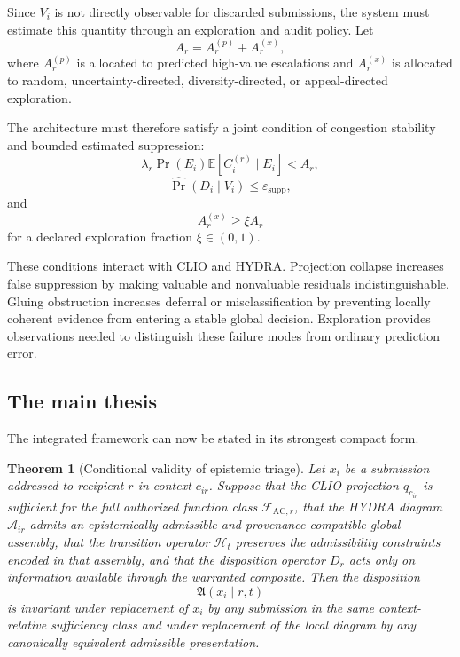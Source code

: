 \documentclass[11pt]{article}
\newtheorem{theorem}[definition]{Theorem}
\theoremstyle{definition}
\DeclareMathOperator{\Prob}{Pr}
\newcommand{\E}{\mathbb{E}}
\newcommand{\F}{\mathcal{F}}
\newcommand{\A}{\mathcal{A}}
\newcommand{\Hh}{\mathcal{H}}
\newcommand{\eps}{\varepsilon}
\newcommand{\AC}{\mathfrak{A}}
\begin{document}
Since \(V_i\) is not directly observable for discarded submissions, the system must estimate this quantity through an exploration and audit policy. Let
\[
A_r=A_r^{(p)}+A_r^{(x)},
\]
where \(A_r^{(p)}\) is allocated to predicted high-value escalations and \(A_r^{(x)}\) is allocated to random, uncertainty-directed, diversity-directed, or appeal-directed exploration.

The architecture must therefore satisfy a joint condition of congestion stability and bounded estimated suppression:
\[
\lambda_r
\Prob(E_i)
\E[C_i^{(r)}\mid E_i]
<
A_r,
\]
\[
\widehat{\Prob}(D_i\mid V_i)
\leq
\eps_{\mathrm{supp}},
\]
and
\[
A_r^{(x)}
\geq
\xi A_r
\]
for a declared exploration fraction \(\xi\in(0,1)\).

These conditions interact with CLIO and HYDRA. Projection collapse increases false suppression by making valuable and nonvaluable residuals indistinguishable. Gluing obstruction increases deferral or misclassification by preventing locally coherent evidence from entering a stable global decision. Exploration provides observations needed to distinguish these failure modes from ordinary prediction error.

\subsection{The main thesis}

The integrated framework can now be stated in its strongest compact form.

\begin{theorem}[Conditional validity of epistemic triage]
Let \(x_i\) be a submission addressed to recipient \(r\) in context \(c_{ir}\). Suppose that the CLIO projection \(q_{c_{ir}}\) is sufficient for the full authorized function class \(\F_{\mathrm{AC},r}\), that the HYDRA diagram \(\A_{ir}\) admits an epistemically admissible and provenance-compatible global assembly, that the transition operator \(\Hh_t\) preserves the admissibility constraints encoded in that assembly, and that the disposition operator \(D_r\) acts only on information available through the warranted composite. Then the disposition
\[
\AC(x_i\mid r,t)
\]
is invariant under replacement of \(x_i\) by any submission in the same context-relative sufficiency class and under replacement of the local diagram by any canonically equivalent admissible presentation.
\end{theorem}
\end{document}
